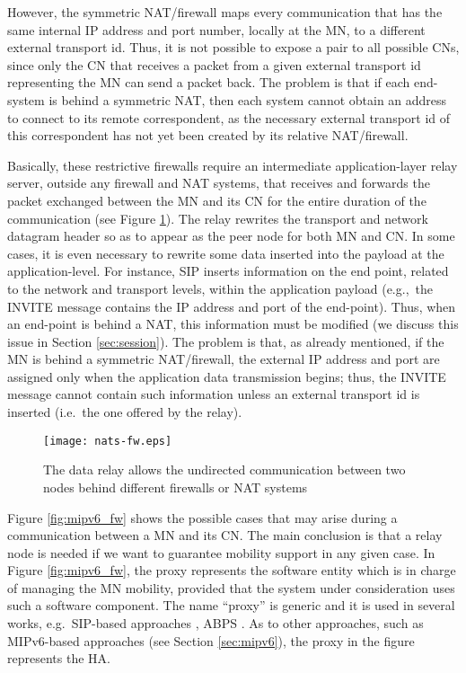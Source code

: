 \documentclass[preprint,12pt]{elsarticle}
\begin{document}
However, the symmetric NAT/firewall maps every communication that has the same internal IP address and port number, locally at the MN, to a different external transport id. 
Thus, it is not possible to expose a  
pair to all possible CNs, since
only the CN that receives a packet from a given external transport id representing 
the MN can send a packet back. 
The problem is that if each end-system is behind a symmetric NAT, then 
each system cannot obtain an address to connect to its remote correspondent, as the necessary external transport id of this correspondent has not yet been created by its relative NAT/firewall.

Basically, these restrictive firewalls require an intermediate 
application-layer relay server, outside any firewall and NAT systems, that 
receives and forwards the packet exchanged between the MN and its CN for the 
entire duration of the communication (see Figure \ref{fig:nat}). The relay 
rewrites the transport and network datagram header so as to appear as the peer 
node for both MN and CN.
In some cases, it is even necessary to rewrite some data inserted 
into the payload at the application-level. 
For instance, SIP inserts information on the end point, related to the network and transport levels, within the application payload (e.g.,~the INVITE message 
contains the IP address and port of the end-point). Thus, when an end-point is 
behind a NAT, this information must be modified (we discuss this issue in Section \ref{sec:session}). 
The problem is that, as already mentioned, if the MN is behind a symmetric NAT/firewall, 
the external IP address and port are assigned only when the application data transmission begins; 
thus, the INVITE message cannot contain such information
unless an external transport id is inserted (i.e.~the one offered by the relay).

\begin{figure}[h]
   \centering
   \texttt{[image: nats-fw.eps]}
   \caption{The data relay allows the undirected communication between two nodes 
behind different firewalls or NAT systems}
   \label{fig:nat}
\end{figure}

Figure \ref{fig:mipv6_fw} shows the possible cases that may arise during a 
communication between a MN and its CN. 
The main conclusion is that a relay node is needed if we want to guarantee mobility support in any given case. In Figure \ref{fig:mipv6_fw}, the proxy represents the software entity which is in charge of managing the MN mobility, provided that the system under consideration uses such a software component. 
The name ``proxy'' is generic and it is used in several works, e.g.~SIP-based 
approaches \cite{RFC3261,Bellavista:2010,Kalmanek:2006,Schulzrinne:2000,
Udugama:2007}, ABPS \cite{GhiniJSS}. As to other approaches, such as MIPv6-based approaches (see Section \ref{sec:mipv6}), the proxy in 
the figure represents the \acf{HA}.
\end{document}
